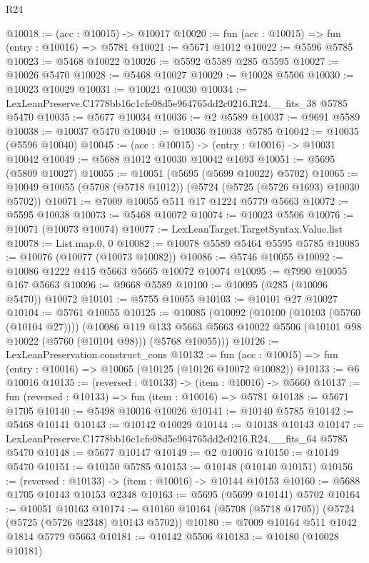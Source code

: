 \begin{lexlean}{R24}
\begin{coremodule}
@10018 := (acc : @10015) -> @10017
@10020 := fun (acc : @10015) => fun (entry : @10016) => @5781
@10021 := @5671 @1012
@10022 := @5596 @5785
@10023 := @5468 @10022
@10026 := @5592 @5589 @285 @5595
@10027 := @10026 @5470
@10028 := @5468 @10027
@10029 := @10028 @5506
@10030 := @10023 @10029
@10031 := @10021 @10030
@10034 := LexLeanPreserve.C1778bb16c1cfe08d5e964765dd2c0216.R24.__fits_38 @5785 @5470
@10035 := @5677 @10034
@10036 := @2 @5589
@10037 := @9691 @5589
@10038 := @10037 @5470
@10040 := @10036 @10038 @5785
@10042 := @10035 (@5596 @10040)
@10045 := (acc : @10015) -> (entry : @10016) -> @10031 @10042
@10049 := @5688 @1012 @10030 @10042 @1693
@10051 := @5695 (@5809 @10027)
@10055 := @10051 (@5695 (@5699 @10022) @5702)
@10065 := @10049 @10055 (@5708 (@5718 @1012)) (@5724 (@5725 (@5726 @1693) @10030 @5702))
@10071 := @7009 @10055 @511 @17 @1224 @5779 @5663
@10072 := @5595 @10038
@10073 := @5468 @10072
@10074 := @10023 @5506
@10076 := @10071 (@10073 @10074)
@10077 := LexLeanTarget.TargetSyntax.Value.list
@10078 := List.map.{0, 0}
@10082 := @10078 @5589 @5464 @5595 @5785
@10085 := @10076 (@10077 (@10073 @10082))
@10086 := @5746 @10055
@10092 := @10086 @1222 @415 @5663 @5665 @10072 @10074
@10095 := @7990 @10055 @167 @5663
@10096 := @9668 @5589
@10100 := @10095 (@285 (@10096 @5470)) @10072
@10101 := @5755 @10055
@10103 := @10101 @27 @10027
@10104 := @5761 @10055
@10125 := @10085
    (@10092
      (@10100 (@10103 (@5760 (@10104 @27))))
      (@10086
        @119
        @133
        @5663
        @5663
        @10022
        @5506
        (@10101 @98 @10022 (@5760 (@10104 @98)))
        (@5768 @10055)))
@10126 := LexLeanPreservation.construct_cons
@10132 := fun (acc : @10015) => fun (entry : @10016) => @10065 (@10125 (@10126 @10072 @10082))
@10133 := @6 @10016
@10135 := (reversed : @10133) -> (item : @10016) -> @5660
@10137 := fun (reversed : @10133) => fun (item : @10016) => @5781
@10138 := @5671 @1705
@10140 := @5498 @10016 @10026
@10141 := @10140 @5785
@10142 := @5468 @10141
@10143 := @10142 @10029
@10144 := @10138 @10143
@10147 := LexLeanPreserve.C1778bb16c1cfe08d5e964765dd2c0216.R24.__fits_64 @5785 @5470
@10148 := @5677 @10147
@10149 := @2 @10016
@10150 := @10149 @5470
@10151 := @10150 @5785
@10153 := @10148 (@10140 @10151)
@10156 := (reversed : @10133) -> (item : @10016) -> @10144 @10153
@10160 := @5688 @1705 @10143 @10153 @2348
@10163 := @5695 (@5699 @10141) @5702
@10164 := @10051 @10163
@10174 := @10160 @10164 (@5708 (@5718 @1705)) (@5724 (@5725 (@5726 @2348) @10143 @5702))
@10180 := @7009 @10164 @511 @1042 @1814 @5779 @5663
@10181 := @10142 @5506
@10183 := @10180 (@10028 @10181)

\end{coremodule}
\end{lexlean}

